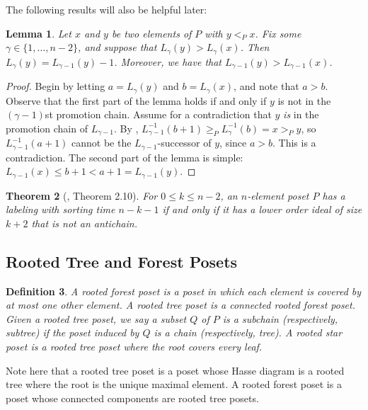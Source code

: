 \documentclass[11pt]{amsart}
\newtheorem{thm}{Theorem}[section]
\newtheorem{lemma}[thm]{Lemma}
\newtheorem{Definition}[thm]{Definition}
\newenvironment{definition}
{\begin{Definition}\rm}{\end{Definition}}
\theoremstyle{definition}
\newcommand{\inverse}{^{-1}}
\begin{document}
The following results will also be helpful later:
\begin{lemma}\label{inversion}
	Let $ x $ and $ y $ be two elements of $ P $ with $ y<_P x $. Fix some $ \gamma\in\{1,\ldots,n-2\} $, and suppose that $ L_\gamma(y)>L_\gamma(x) $. Then $ L_{\gamma}(y)=L_{\gamma-1}(y)-1 $. Moreover, we have that $ L_{\gamma-1}(y)>L_{\gamma-1}(x) $. 
\end{lemma}
\begin{proof}	
	Begin by letting $ a=L_\gamma(y) $ and $ b=L_{\gamma}(x) $, and note that $ a>b $. Observe that the first part of the lemma holds if and only if $ y $ is not in the $ (\gamma-1) $st promotion chain. Assume for a contradiction that $ y $ \emph{is} in the promotion chain of $ L_{\gamma-1} $. By , $ L_{\gamma-1}\inverse(b+1)\geq_P L_{\gamma}\inverse(b)=x>_Py $, so $ L_{\gamma-1}\inverse(a+1) $ cannot be the $ L_{\gamma-1} $-successor of $ y $, since $ a>b $. This is a contradiction. The second part of the lemma is simple: $ L_{\gamma-1}(x)\leq b+1<a+1=L_{\gamma-1}(y) $. 
\end{proof}

\begin{thm}[\cite{DK20}, Theorem 2.10]\label{k-untangled}
	For $ 0\leq k\leq n-2 $, an $ n $-element poset $ P $ has a labeling with sorting time $ n-k-1 $ if and only if it  has a lower order ideal of size $ k+2 $ that is not an antichain.
\end{thm}



\subsection{Rooted Tree and Forest Posets}
\begin{definition}
	A \emph{rooted forest poset} is a poset in which each element is covered by at most one other element. A \emph{rooted tree poset} is a connected rooted forest poset. Given a rooted tree poset, we say a subset $ Q $ of $ P $ is a subchain (respectively, subtree) if the poset induced by $ Q $ is a chain (respectively, tree). A \emph{rooted star poset} is a rooted tree poset where the root covers every leaf.
\end{definition} Note here that a rooted tree poset is a poset whose Hasse diagram is a rooted tree where the root is the unique maximal element. A rooted forest poset is a poset whose connected components are rooted tree posets. 
\end{document}
